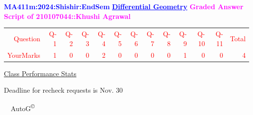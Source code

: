 \documentclass{article}                              %
\begin{document}
%
\vspace*{1in}

\begin{center}
	\textbf{\textcolor{blue}{\LARGE MA411m:2024:Shishir:EndSem}}
	\vskip 1cm
	\textbf{\textcolor{blue}{\underline{\Large Differential Geometry}}}
	\vskip 1cm
	\textbf{\textcolor{magenta}{\LARGE Graded Answer Script of 210107044::Khushi Agrawal}}
\end{center}


\begin{center}
	\Huge 
	\textcolor{red}{
	\begin{tabular}{*{13}{r}}
		Question&Q-1& Q-2& Q-3& Q-4& Q-5& Q-6& Q-7& Q-8& Q-9& Q-10& Q-11&Total  \\
        	YourMarks&1&0&0&2&0&0&0&0&1&0&0&4
	\end{tabular}
	}
        \vskip 2cm
	\large
	\underline{Class Performance Stats}
	\DTLsetseparator{;}
	\begin{table}[htbp]
		\centering
	\end{table}
	\vskip 1cm
	Deadline for recheck requests is Nov. 30
\end{center}
\ \vfill \ \hfill \small AutoG\textsuperscript{\copyright}
\newpage
%
\end{document}
